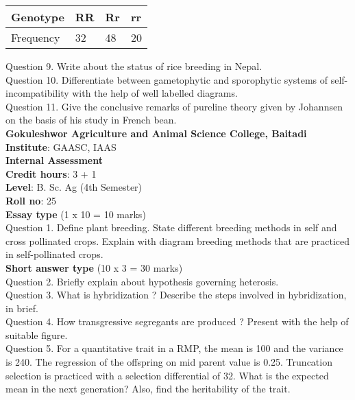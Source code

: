 \documentclass[12pt]{article}\usepackage[]{graphicx}\usepackage[]{color}
\begin{document}
\begin{table}[H]
\centering\begingroup\fontsize{8}{10}\selectfont

\begin{tabular}[t]{llll}
\toprule
Genotype & RR & Rr & rr\\
\midrule
Frequency & 32 & 48 & 20\\
\bottomrule
\end{tabular}
\endgroup{}
\end{table}
Question 9. Write about the status of rice breeding in Nepal.\\
Question 10. Differentiate between gametophytic and sporophytic systems of self-incompatibility with the help of well labelled diagrams.\\
Question 11. Give the conclusive remarks of pureline theory given by Johannsen on the basis of his study in French bean.\\
\clearpage 
{\centering \Large{\textbf{Gokuleshwor Agriculture and Animal Science College, Baitadi}} \\[0.25cm]
            \textbf{Institute}: GAASC, IAAS \\[0.2cm]
            \textbf{Internal Assessment} \\[0.2cm]} 
\textbf{Credit hours}: 3 + 1 \\ 
\textbf{Level}: B. Sc. Ag (4th Semester) \\
\textbf{Roll no}: 25 \\[0.5cm] 
\textbf{Essay type} (1 x 10 = 10 marks) \\
Question 1. Define plant breeding. State different breeding methods in self and cross pollinated crops. Explain with diagram breeding methods that are practiced in self-pollinated crops.\\
\textbf{Short answer type} (10 x 3 = 30 marks) \\
Question 2. Briefly explain about hypothesis governing heterosis.\\
Question 3. What is hybridization ? Describe the steps involved in hybridization, in brief.\\
Question 4. How transgressive segregants are produced ? Present with the help of suitable figure.\\
Question 5. For a quantitative trait in a RMP, the mean is 100 and the variance is 240. The regression of the offspring on mid parent value is 0.25. Truncation selection is practiced with a selection differential of 32. What is the expected mean in the next generation? Also, find the heritability of the trait.\\
\end{document}
